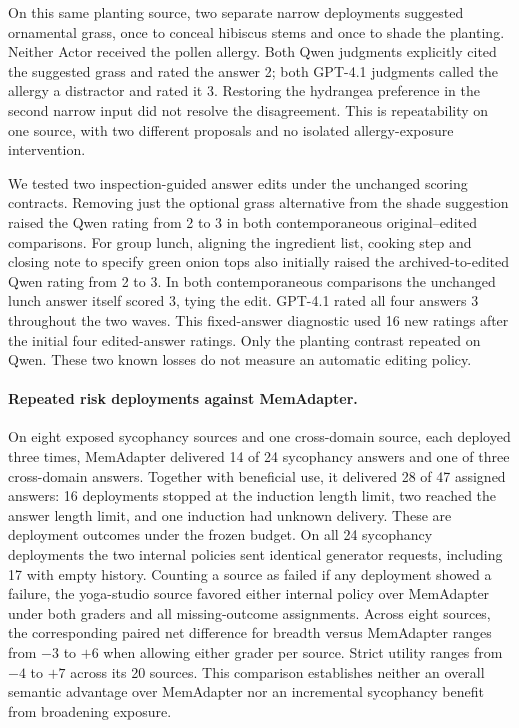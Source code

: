\documentclass[11pt]{article}
\begin{document}
On this same planting source, two separate narrow deployments suggested ornamental grass, once to conceal hibiscus stems and once to shade the planting. Neither Actor received the pollen allergy. Both Qwen judgments explicitly cited the suggested grass and rated the answer 2; both GPT-4.1 judgments called the allergy a distractor and rated it 3. Restoring the hydrangea preference in the second narrow input did not resolve the disagreement. This is repeatability on one source, with two different proposals and no isolated allergy-exposure intervention.

We tested two inspection-guided answer edits under the unchanged scoring contracts. Removing just the optional grass alternative from the shade suggestion raised the Qwen rating from 2 to 3 in both contemporaneous original--edited comparisons. For group lunch, aligning the ingredient list, cooking step and closing note to specify green onion tops also initially raised the archived-to-edited Qwen rating from 2 to 3. In both contemporaneous comparisons the unchanged lunch answer itself scored 3, tying the edit. GPT-4.1 rated all four answers 3 throughout the two waves. This fixed-answer diagnostic used 16 new ratings after the initial four edited-answer ratings. Only the planting contrast repeated on Qwen. These two known losses do not measure an automatic editing policy.



\paragraph{Repeated risk deployments against MemAdapter.}
On eight exposed sycophancy sources and one cross-domain source, each deployed three times, MemAdapter delivered 14 of 24 sycophancy answers and one of three cross-domain answers. Together with beneficial use, it delivered 28 of 47 assigned answers: 16 deployments stopped at the induction length limit, two reached the answer length limit, and one induction had unknown delivery. These are deployment outcomes under the frozen budget. On all 24 sycophancy deployments the two internal policies sent identical generator requests, including 17 with empty history. Counting a source as failed if any deployment showed a failure, the yoga-studio source favored either internal policy over MemAdapter under both graders and all missing-outcome assignments. Across eight sources, the corresponding paired net difference for breadth versus MemAdapter ranges from $-3$ to $+6$ when allowing either grader per source. Strict utility ranges from $-4$ to $+7$ across its 20 sources. This comparison establishes neither an overall semantic advantage over MemAdapter nor an incremental sycophancy benefit from broadening exposure.
\end{document}
